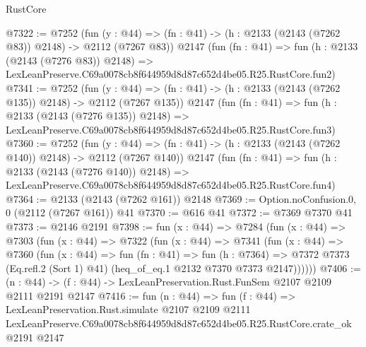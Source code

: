 \begin{lexlean}{RustCore}
\begin{coremodule}
@7322 := @7252
    (fun (y : @44) => (fn : @41) -> (h : @2133 (@2143 (@7262 @83)) @2148) -> @2112 (@7267 @83))
    @2147
    (fun (fn : @41) =>
    fun (h : @2133 (@2143 (@7276 @83)) @2148) =>
    LexLeanPreserve.C69a0078cb8f644959d8d87c652d4be05.R25.RustCore.fun2)
@7341 := @7252
    (fun (y : @44) => (fn : @41) -> (h : @2133 (@2143 (@7262 @135)) @2148) -> @2112 (@7267 @135))
    @2147
    (fun (fn : @41) =>
    fun (h : @2133 (@2143 (@7276 @135)) @2148) =>
    LexLeanPreserve.C69a0078cb8f644959d8d87c652d4be05.R25.RustCore.fun3)
@7360 := @7252
    (fun (y : @44) => (fn : @41) -> (h : @2133 (@2143 (@7262 @140)) @2148) -> @2112 (@7267 @140))
    @2147
    (fun (fn : @41) =>
    fun (h : @2133 (@2143 (@7276 @140)) @2148) =>
    LexLeanPreserve.C69a0078cb8f644959d8d87c652d4be05.R25.RustCore.fun4)
@7364 := @2133 (@2143 (@7262 @161)) @2148
@7369 := Option.noConfusion.{0, 0} (@2112 (@7267 @161)) @41
@7370 := @616 @41
@7372 := @7369 @7370 @41
@7373 := @2146 @2191
@7398 := fun (x : @44) =>
  @7284
    (fun (x : @44) =>
    @7303
      (fun (x : @44) =>
      @7322
        (fun (x : @44) =>
        @7341
          (fun (x : @44) =>
          @7360
            (fun (x : @44) =>
            fun (fn : @41) =>
            fun (h : @7364) =>
            @7372 @7373 (Eq.refl.{2} (Sort 1) @41) (heq_of_eq.{1} @2132 @7370 @7373 @2147))))))
@7406 := (n : @44) -> (f : @44) -> LexLeanPreservation.Rust.FunSem @2107 @2109 @2111 @2191 @2147
@7416 := fun (n : @44) =>
  fun (f : @44) =>
  LexLeanPreservation.Rust.simulate
    @2107
    @2109
    @2111
    LexLeanPreserve.C69a0078cb8f644959d8d87c652d4be05.R25.RustCore.crate_ok
    @2191
    @2147
\end{coremodule}
\end{lexlean}
